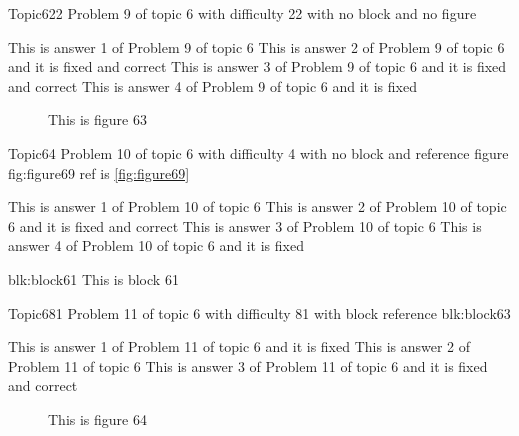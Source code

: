 \documentclass[master]{exam}
\begin{document}
\begin{problem}{Topic6}{22}
	Problem 9 of topic 6 with difficulty 22 with no block and no figure
	\begin{answers}
		\answer This is answer 1 of Problem 9 of topic 6 
		 This is answer 2 of Problem 9 of topic 6 and it is fixed and correct
		 This is answer 3 of Problem 9 of topic 6 and it is fixed and correct
		\answer[fixed] This is answer 4 of Problem 9 of topic 6 and it is fixed
	\end{answers}
\end{problem}



\begin{figure}
	\begin{center}
		This is figure 63 
		\label{fig:figure63}
	\end{center}
\end{figure}

\begin{problem}{Topic6}{4}
	Problem 10 of topic 6 with difficulty 4 with no block and reference figure fig:figure69 ref is \ref{fig:figure69}
	\begin{answers}
		\answer This is answer 1 of Problem 10 of topic 6 
		 This is answer 2 of Problem 10 of topic 6 and it is fixed and correct
		\answer This is answer 3 of Problem 10 of topic 6 
		\answer[fixed] This is answer 4 of Problem 10 of topic 6 and it is fixed
	\end{answers}
\end{problem}



\begin{block}{blk:block61}
This is block 61
\end{block}


\begin{problem}[requires=blk:block63]{Topic6}{81}
	Problem 11 of topic 6 with difficulty 81 with block reference blk:block63
	\begin{answers}
		\answer[fixed] This is answer 1 of Problem 11 of topic 6 and it is fixed
		\answer This is answer 2 of Problem 11 of topic 6 
		 This is answer 3 of Problem 11 of topic 6 and it is fixed and correct
	\end{answers}
\end{problem}



\begin{figure}
	\begin{center}
		This is figure 64 
		\label{fig:figure64}
	\end{center}
\end{figure}
\end{document}
